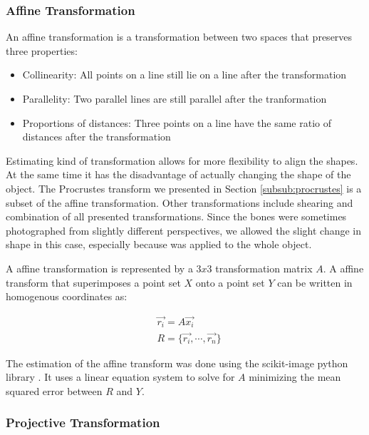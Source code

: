 \documentclass[pdftex,12pt,a4paper]{report}
\begin{document}
\subsubsection{Affine Transformation}
\label{subsub:affine}

An affine transformation is a transformation between two spaces that preserves three properties:

\begin{itemize}
\item Collinearity: All points on a line still lie on a line after the transformation
\item Parallelity: Two parallel lines are still parallel after the tranformation
\item Proportions of distances: Three points on a line have the same ratio of distances after the transformation
\end{itemize}

Estimating kind of transformation allows for more flexibility to align the shapes. At the same time it has the
disadvantage of actually changing the shape of the object. The Procrustes transform we presented in Section
\ref{subsub:procrustes} is a subset of the affine transformation. Other transformations include shearing and combination of all presented transformations. Since the bones were sometimes photographed from
slightly different perspectives, we allowed the slight change in shape in this case, especially because was
applied to the whole object.

A affine transformation is represented by a $3x3$ transformation matrix $A$. A affine transform that
superimposes a point set $X$ onto a point set $Y$ can be written in homogenous coordinates as:

\begin{equation}
\label{eq:projectivetransformation}
\begin{split}
& \vec{r_i} = A \vec{x_i} \\
& R = \{ \vec{r_i}, \cdots, \vec{r_n} \}
\end{split}
\end{equation}

The estimation of the affine transform was done using the scikit-image python library \cite{van2014scikit}.
It uses a linear equation system to solve for $A$ minimizing the mean squared error between $R$ and $Y$.

\subsubsection{Projective Transformation}
\end{document}
